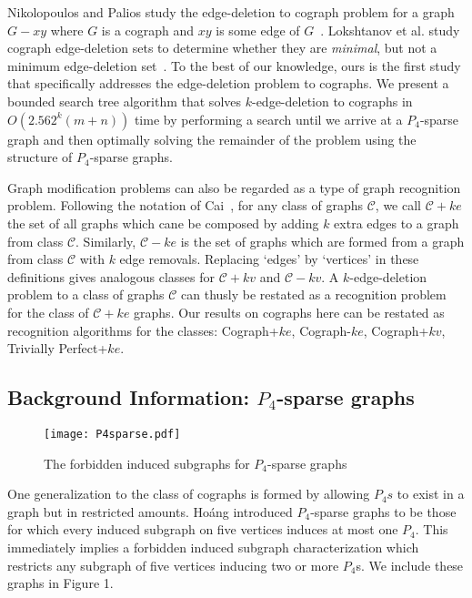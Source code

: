 \documentclass{llncs}
\begin{document}
Nikolopoulos and Palios study the edge-deletion to cograph problem for a graph $G-xy$ where $G$ is a cograph and $xy$ is some edge of $G$~\cite{NikoPalio}. Lokshtanov et al. study cograph edge-deletion sets to determine whether they are \emph{minimal}, but not a minimum edge-deletion set~\cite{LMP}. To the best of our knowledge, ours is the first study that specifically addresses the edge-deletion problem to cographs. We present a bounded search tree algorithm that solves $k$-edge-deletion to cographs in $O(2.562^k(m+n))$ time by performing a search until we arrive at a $P_4$-sparse graph and then optimally solving the remainder of the problem using the structure of $P_4$-sparse graphs.

Graph modification problems can also be regarded as a type of graph recognition problem. Following the notation of Cai~\cite{CAI}, for any class of graphs $\mathcal{C}$, we call $\mathcal{C}+ke$ the set of all graphs which cane be composed by adding $k$ extra edges to a graph from class $\mathcal{C}$. Similarly, $\mathcal{C}-ke$ is the set of graphs which are formed from a graph from class $\mathcal{C}$ with $k$ edge removals. Replacing `edges' by `vertices' in these definitions gives analogous classes for $\mathcal{C}+kv$ and $\mathcal{C}-kv$. A $k$-edge-deletion problem to a class of graphs $\mathcal{C}$ can thusly be restated as a recognition problem for the class of $\mathcal{C}+ke$ graphs. Our results on cographs here can be restated as recognition algorithms for the classes: Cograph+$ke$, Cograph-$ke$, Cograph+$kv$, Trivially Perfect+$ke$.

\subsection{Background Information: $P_4$-sparse graphs}

\begin{figure}
  \texttt{[image: P4sparse.pdf]}\\
  \caption{The forbidden induced subgraphs for $P_4$-sparse graphs}\label{forb}
\end{figure}

One generalization to the class of cographs is formed by allowing $P_4s$ to exist in a graph but in restricted amounts. Ho\'ang \cite{Hoa} introduced $P_4$-sparse graphs to be those for which every induced subgraph on five vertices induces at most one $P_4$. This immediately implies a forbidden induced subgraph characterization which restricts any subgraph of five vertices inducing two or more $P_4$s. We include these graphs in Figure 1.
\end{document}
